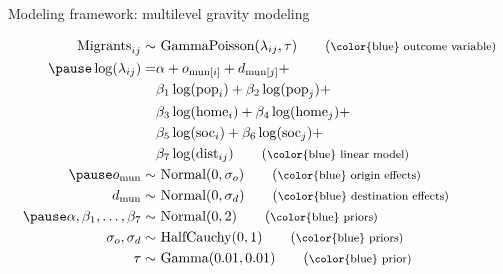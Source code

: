 \documentclass{beamer}
\begin{document}
\begin{frame}[fragile]{Modeling framework: multilevel gravity modeling}
\begin{small}
	\begin{align} \text{Migrants}_{ij} \sim & \text{ GammaPoisson}(\lambda_{ij}, \tau) \tag{\footnotesize \color{blue} outcome variable} \\ \pause
	\log(\lambda_{ij}) =
	& \alpha + o_{\text{mun}[i]} + d_{\text{mun}[j]} + \notag
	\\ & \beta_1 \log(\text{pop}_i) + \notag
	\beta_2\log(\text{pop}_j) + \notag \\ & \beta_3
	\log(\text{home}_i) + \beta_4 \log(\text{home}_j) + \notag\\
	& \beta_5 \log(\text{soc}_i) + \beta_6 \log(\text{soc}_j) + \notag \\ 
	& \beta_7 \log(\text{dist}_{ij})  \tag{\footnotesize \color{blue} linear model}  \\ \pause
	o_{\text{mun}} \sim& \text{ Normal}(0, \sigma_o)  \tag{\footnotesize \color{blue} origin effects}  \\ 
	d_{\text{mun}} \sim& \text{ Normal}(0, \sigma_d)   \tag{\footnotesize \color{blue} destination effects}  \\ \pause
	\alpha, \beta_1,\ldots, \beta_7 \sim& \text{
		Normal}(0,2) \tag{\footnotesize \color{blue} priors} \\ 
	\sigma_o, \sigma_d \sim& \text{ HalfCauchy}(0,1) \tag{\footnotesize \color{blue} priors}  \\ 
	\tau \sim& \text{ Gamma}(0.01, 0.01)  \tag{\footnotesize \color{blue} prior}  
	\end{align}
\end{small}
\end{frame}
\end{document}
